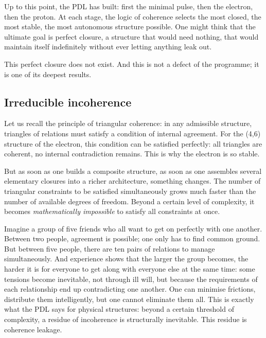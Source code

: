 \documentclass[12pt, a4paper, openright]{book}
\begin{document}
Up to this point, the PDL has built: first the minimal pulse, then the electron, then the proton. At each stage, the logic of coherence selects the most closed, the most stable, the most autonomous structure possible. One might think that the ultimate goal is perfect closure, a structure that would need nothing, that would maintain itself indefinitely without ever letting anything leak out.

\medskip

This perfect closure does not exist. And this is not a defect of the programme; it is one of its deepest results.

\subsection*{Irreducible incoherence}

Let us recall the principle of triangular coherence: in any admissible structure, triangles of relations must satisfy a condition of internal agreement. For the (4,6) structure of the electron, this condition can be satisfied perfectly: all triangles are coherent, no internal contradiction remains. This is why the electron is so stable.

\medskip

But as soon as one builds a composite structure, as soon as one assembles several elementary closures into a richer architecture, something changes. The number of triangular constraints to be satisfied simultaneously grows much faster than the number of available degrees of freedom. Beyond a certain level of complexity, it becomes \emph{mathematically impossible} to satisfy all constraints at once.

\medskip

Imagine a group of five friends who all want to get on perfectly with one another. Between two people, agreement is possible; one only has to find common ground. But between five people, there are ten pairs of relations to manage simultaneously. And experience shows that the larger the group becomes, the harder it is for everyone to get along with everyone else at the same time: some tensions become inevitable, not through ill will, but because the requirements of each relationship end up contradicting one another. One can minimise frictions, distribute them intelligently, but one cannot eliminate them all. This is exactly what the PDL says for physical structures: beyond a certain threshold of complexity, a residue of incoherence is structurally inevitable. This residue is coherence leakage.
\end{document}
